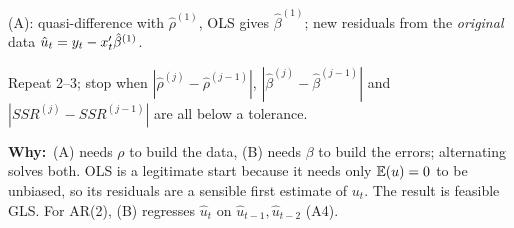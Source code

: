 \documentclass[11pt]{article}
\newcommand{\Why}{\textbf{\textcolor{whyline}{Why:}}\ }
\begin{document}
\begin{solbox}
\begin{flatnum}
  \item (A): quasi-difference with $\hat\rho^{(1)}$, OLS gives $\hat\beta^{(1)}$; new residuals from the \emph{original} data $\hat u_{t}=y_{t}-x_{t}^{\prime}\hat\beta^{(1)}$.
  \item Repeat 2--3; stop when $|\hat\rho^{(j)}-\hat\rho^{(j-1)}|$, $|\hat\beta^{(j)}-\hat\beta^{(j-1)}|$ and $|SSR^{(j)}-SSR^{(j-1)}|$ are all below a tolerance.
\end{flatnum}
\begin{why}\Why (A) needs $\rho$ to build the data, (B) needs $\beta$ to build the errors; alternating solves both. OLS is a legitimate start because it needs only $\mathbb{E}(u)=0$ to be unbiased,
so its residuals are a sensible first estimate of $u_{t}$. The result is feasible GLS. For AR(2), (B) regresses $\hat u_{t}$ on $\hat u_{t-1},\hat u_{t-2}$ (A4).\end{why}
\end{solbox}
\end{document}

